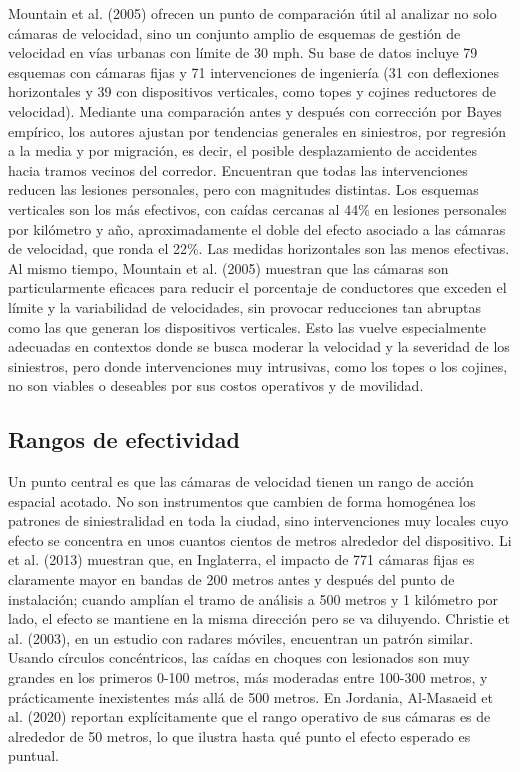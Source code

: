 Mountain et al. (2005) ofrecen un punto de comparación útil al analizar no solo cámaras de velocidad, sino un conjunto amplio de esquemas de gestión de velocidad en vías urbanas con límite de 30 mph. Su base de datos incluye 79 esquemas con cámaras fijas y 71 intervenciones de ingeniería (31 con deflexiones horizontales y 39 con dispositivos verticales, como topes y cojines reductores de velocidad). Mediante una comparación antes y después con corrección por Bayes empírico, los autores ajustan por tendencias generales en siniestros, por regresión a la media y por migración, es decir, el posible desplazamiento de accidentes hacia tramos vecinos del corredor. Encuentran que todas las intervenciones reducen las lesiones personales, pero con magnitudes distintas. Los esquemas verticales son los más efectivos, con caídas cercanas al 44\% en lesiones personales por kilómetro y año, aproximadamente el doble del efecto asociado a las cámaras de velocidad, que ronda el 22\%. Las medidas horizontales son las menos efectivas. Al mismo tiempo, Mountain et al. (2005) muestran que las cámaras son particularmente eficaces para reducir el porcentaje de conductores que exceden el límite y la variabilidad de velocidades, sin provocar reducciones tan abruptas como las que generan los dispositivos verticales. Esto las vuelve especialmente adecuadas en contextos donde se busca moderar la velocidad y la severidad de los siniestros, pero donde intervenciones muy intrusivas, como los topes o los cojines, no son viables o deseables por sus costos operativos y de movilidad.\\ 

\subsection{Rangos de efectividad}
\noindent Un punto central es que las cámaras de velocidad tienen un rango de acción espacial acotado. No son instrumentos que cambien de forma homogénea los patrones de siniestralidad en toda la ciudad, sino intervenciones muy locales cuyo efecto se concentra en unos cuantos cientos de metros alrededor del dispositivo. Li et al. (2013) muestran que, en Inglaterra, el impacto de 771 cámaras fijas es claramente mayor en bandas de 200 metros antes y después del punto de instalación; cuando amplían el tramo de análisis a 500 metros y 1 kilómetro por lado, el efecto se mantiene en la misma dirección pero se va diluyendo. Christie et al. (2003), en un estudio con radares móviles, encuentran un patrón similar. Usando círculos concéntricos, las caídas en choques con lesionados son muy grandes en los primeros 0-100 metros, más moderadas entre 100-300 metros, y prácticamente inexistentes más allá de 500 metros. En Jordania, Al‑Masaeid et al. (2020) reportan explícitamente que el rango operativo de sus cámaras es de alrededor de 50 metros, lo que ilustra hasta qué punto el efecto esperado es puntual.

